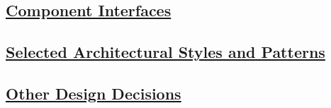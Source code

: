 	\subsection[Component Interfaces]{\hyperlink{toc}{Component Interfaces}}
		\label{sec:componentInterfaces}
		
	\subsection[Selected Architectural Styles and Patterns]{\hyperlink{toc}{Selected Architectural Styles and Patterns}}
		\label{sec:selectedArchitecturalStylesAndPatterns}
		
	\subsection[Other Design Decisions]{\hyperlink{toc}{Other Design Decisions}}
		\label{sec:otherDesignDecisions}						